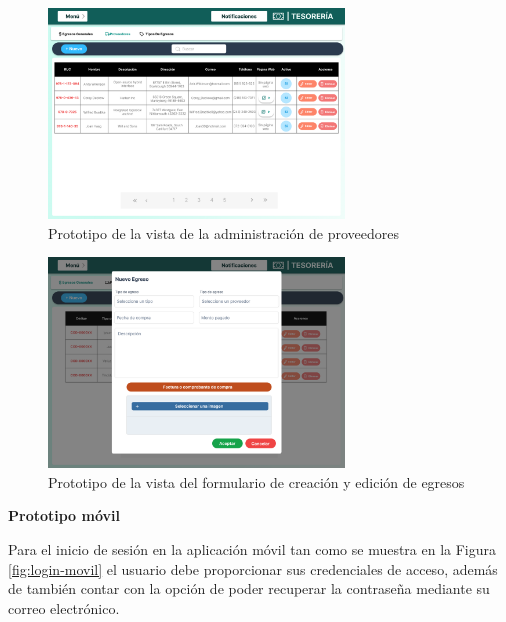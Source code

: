\begin{figure}[H]
    \centering
    \includegraphics[width=0.7\textwidth]{resources/images/tesoreia - egresos - proveedores}
    \caption{Prototipo de la vista de la administración de proveedores}
    \label{fig:tesoreria-egresos-proveedores}
\end{figure}

\begin{figure}[H]
    \centering
    \includegraphics[width=0.7\textwidth]{resources/images/tesoreia - egresos - generales-edit}
    \caption{Prototipo de la vista del formulario de creación y edición de egresos}
    \label{fig:tesoreria-egresos-formulario}
\end{figure}

\textbf{Prototipo móvil}
\bigbreak

Para el inicio de sesión en la aplicación móvil tan como se muestra en la Figura \ref{fig:login-movil} el usuario debe proporcionar sus credenciales de acceso, además de también contar con la opción de poder recuperar la contraseña mediante su correo electrónico.

